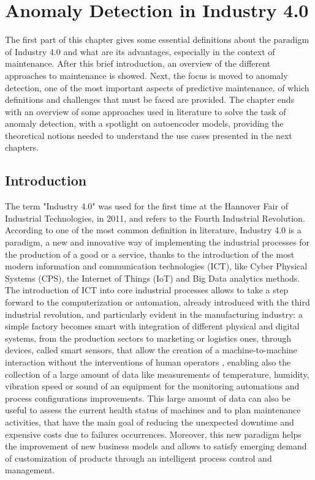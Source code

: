 \chapter{Anomaly Detection in Industry 4.0}


The first part of this chapter gives some essential definitions about the paradigm of Industry 4.0 and what are its advantages, especially in the context of maintenance. After this brief introduction, an overview of the different approaches to maintenance is showed. Next, the focus is moved to anomaly detection, one of the most important aspects of predictive maintenance, of which definitions and challenges that must be faced are provided. The chapter ends with an overview of some approaches used in literature to solve the task of anomaly detection, with a spotlight on autoencoder models, providing the theoretical notions needed to understand the use cases presented in the next chapters.


\section{Introduction}
The term "Industry 4.0" was used for the first time at the Hannover Fair of Industrial Technologies, in 2011, and refers to the Fourth Industrial Revolution. According to one of the most common definition in literature, Industry 4.0 is a paradigm, a new and innovative way of implementing the industrial processes for the production of a good or a service, thanks to the introduction of the most modern information and communication technologies (ICT), like Cyber Physical Systems (CPS), the Internet of Things (IoT) and Big Data analytics methods.\\ 
The introduction of ICT into core industrial processes allows to take a step forward to the computerization or automation, already introduced with the third industrial revolution, and particularly evident in the manufacturing industry: a simple factory becomes smart with integration of different physical and digital systems, from the production sectors to marketing or logistics ones, through devices, called smart sensors, that allow the creation of a machine-to-machine interaction without the interventions of human operators \cite{1smartfactory}, enabling also the collection of a large amount of data like measurements of temperature, humidity, vibration speed or sound of an equipment for the monitoring automations and process configurations improvements. This large amount of data can also be useful to assess the current health status of machines and to plan maintenance activities, that have the main goal of reducing the unexpected downtime and expensive costs due to failures occurrences. Moreover, this new paradigm helps the improvement of new business models and allows to satisfy emerging demand of customization of products through an intelligent process control and management.

